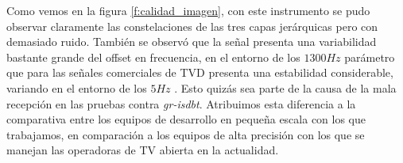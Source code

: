 Como vemos en la figura \ref{f:calidad_imagen}, con este instrumento se pudo observar claramente las constelaciones de las tres capas jerárquicas pero con demasiado ruido. También se observó que la señal presenta una variabilidad bastante grande del offset en frecuencia, en el entorno de los $1300Hz$ parámetro que para las señales comerciales de TVD presenta una estabilidad considerable, variando en el entorno de los $5Hz$ . Esto quizás sea parte de la causa de la mala recepción en las pruebas contra \textit{gr-isdbt}. Atribuimos esta diferencia a la comparativa entre los equipos de desarrollo en pequeña escala con los que trabajamos, en comparación a los equipos de alta precisión con los que se manejan las operadoras de TV abierta en la actualidad.

